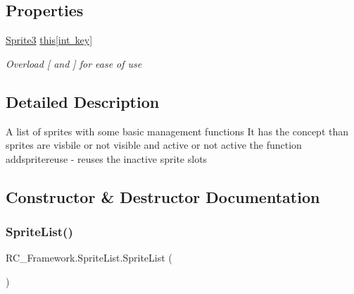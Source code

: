\subsection*{Properties}
\begin{DoxyCompactItemize}
\item 
\mbox{\hyperlink{class_r_c___framework_1_1_sprite3}{Sprite3}} \mbox{\hyperlink{class_r_c___framework_1_1_sprite_list_ad32b304d8023b1a91a3021545436c4e5}{this\mbox{[}int key\mbox{]}}}
\begin{DoxyCompactList}\small\item\em Overload \mbox{[} and \mbox{]} for ease of use \end{DoxyCompactList}\end{DoxyCompactItemize}


\subsection{Detailed Description}
A list of sprites with some basic management functions It has the concept than sprites are visbile or not visible and active or not active the function addspritereuse -\/ reuses the inactive sprite slots 



\subsection{Constructor \& Destructor Documentation}
\mbox{\label{class_r_c___framework_1_1_sprite_list_aa12cce855c8cfefbfb9dd4f011ee6b0c}} 
\subsubsection{\texorpdfstring{Sprite\+List()}{SpriteList()}\hspace{0.1cm}{\footnotesize\ttfamily [1/2]}}
{\footnotesize\ttfamily R\+C\+\_\+\+Framework.\+Sprite\+List.\+Sprite\+List (\begin{DoxyParamCaption}{ }\end{DoxyParamCaption})}



